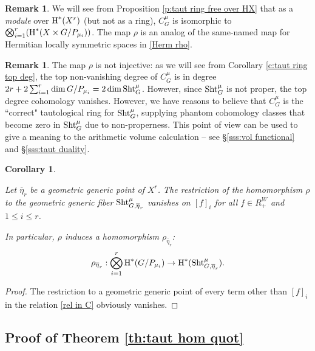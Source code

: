 \documentclass[reqno]{amsart}
\numberwithin{equation}{subsection}
\newtheorem{cor}[subsubsection]{Corollary}
\theoremstyle{definition}
\newtheorem{remark}[subsubsection]{Remark}
\newcommand\Sht{\textup{Sht}}
\newcommand{\ov}{\overline}
\newcommand{\cohog}[2]{\textup{H}^{#1}({#2})}     %
\renewcommand\r\rho
\newcommand{\y}{\eta}
\begin{document}
\begin{remark}
    We will see from Proposition \ref{p:taut ring free over HX} that as a \emph{module} over $\cohog{*}{X^r}$ (but not as a ring), $C^\mu_G$ is isomorphic to $\bigotimes_{i=1}^{r}(\cohog{*}{X\times G/P_{\mu_i}})$. The map $\r$ is an analog of the same-named map for Hermitian locally symmetric spaces in \eqref{Herm rho}. 
\end{remark}

\begin{remark}
    The map $\r$ is not injective: as we will see from Corollary \ref{c:taut ring top deg}, the top non-vanishing degree of $C^\mu_G$ is in degree $2r+2\sum_{i=1}^r\dim G/P_{\mu_i}=2\dim \Sht^\mu_G$. However, since $\Sht^\mu_G$ is not proper, the top degree cohomology vanishes. However, we have reasons to believe that $C^\mu_G$ is the ``correct" tautological ring for $\Sht^\mu_G$, supplying phantom cohomology classes that become zero in $\Sht^\mu_G$ due to non-properness. This point of view can be used to give a meaning to the arithmetic volume calculation -- see \S\ref{sss:vol functional} and \S\ref{sss:taut duality}. 
\end{remark}



\begin{cor}\label{c:taut hom gen}

    Let $\ov \y_{r}$ be a geometric generic point of $X^r$. The restriction of the homomorphism $\r$ to the geometric generic fiber $\Sht^\mu_{G,\ov\y_r}$  vanishes on $[f]_i$ for all $f\in R^W_+$ and $1\leq i\leq r$. 
    
    
    In particular, $\r$ induces a homomorphism $\r_{\ov\eta_{r}}$:
    \begin{equation}\label{taut hom gen}
        \r_{\ov\eta_{r}}: \bigotimes_{i=1}^r\cohog{*}{G/P_{\mu_i}}\to \cohog{*}{\Sht^\mu_{G,\ov\eta_{r}}}.
    \end{equation}
\end{cor}
\begin{proof}
The restriction to a geometric generic point of every term other than $[f]_i$ in the relation \eqref{rel in C} obviously vanishes.
\end{proof}


\subsection{Proof of Theorem \ref{th:taut hom quot}}
\end{document}
